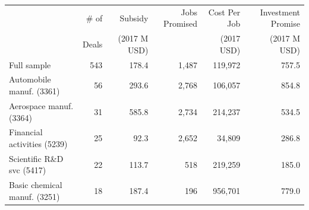 \begin{tabular}{l|rrrrr}
& \# of & Subsidy & Jobs Promised &                          Cost Per Job & Investment Promise \\ 
& Deals & (2017 M USD) & & (2017 USD) & (2017 M USD)\\ 
 \hline
Full sample&543&178.4&1,487&119,972&757.5\\
 \hline
Automobile manuf. (3361)&56&293.6&2,768&106,057&854.8\\
Aerospace manuf. (3364)&31&585.8&2,734&214,237&534.5\\
Financial activities (5239)&25&92.3&2,652&34,809&286.8\\
Scientific R\&D svc (5417)&22&113.7&518&219,259&185.0\\
Basic chemical manuf. (3251)&18&187.4&196&956,701&779.0\\
\bottomrule
\end{tabular}
